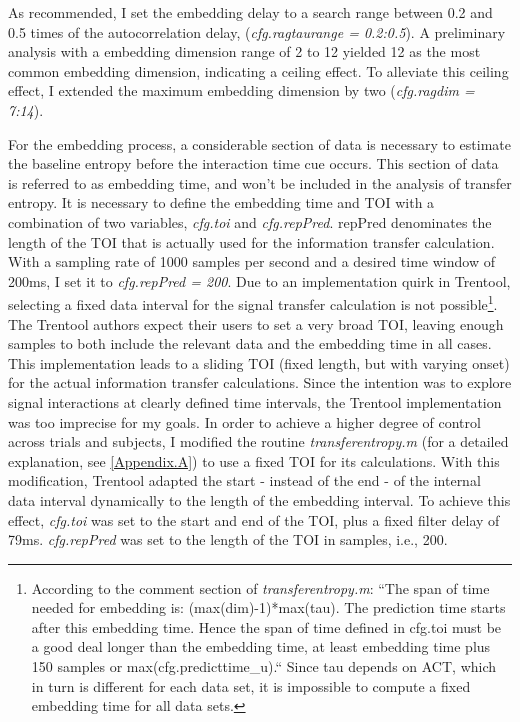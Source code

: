 As recommended, I set the embedding delay to a search range between 0.2 and 0.5 times of the autocorrelation delay, (\emph{cfg.ragtaurange = 0.2:0.5}).
A preliminary analysis with a embedding dimension range of 2 to 12 yielded 12 as the most common embedding dimension, indicating a ceiling effect.
To alleviate this ceiling effect, I extended the maximum embedding dimension by two (\emph{cfg.ragdim = 7:14}).

For the embedding process, a considerable section of data is necessary to estimate the baseline entropy before the interaction time cue occurs.
This section of data is referred to as embedding time, and won't be included in the analysis of transfer entropy.
It is necessary to define the embedding time and TOI with a combination of two variables, \emph{cfg.toi} and \emph{cfg.repPred}.
repPred denominates the length of the TOI that is actually used for the information transfer calculation.
With a sampling rate of 1000 samples per second and a desired time window of 200ms, I set it to \emph{cfg.repPred = 200}.
Due to an implementation quirk in Trentool, selecting a fixed data interval for the signal transfer calculation is not possible\footnote{According to the comment section of \emph{transferentropy.m}: ``The span of time needed for embedding is: (max(dim)-1)*max(tau). The prediction time starts after this embedding time. Hence the span of time defined in cfg.toi must be a good deal longer than the embedding time, at least embedding time plus 150 samples or max(cfg.predicttime\_u).``
Since tau depends on ACT, which in turn is different for each data set, it is impossible to compute a fixed embedding time for all data sets.}. The Trentool authors expect their users to set a very broad TOI, leaving enough samples to both include the relevant data and the embedding time in all cases.
This implementation leads to a sliding TOI (fixed length, but with varying onset) for the actual information transfer calculations.
Since the intention was to explore signal interactions at clearly defined time intervals, the Trentool implementation was too imprecise for my goals.
In order to achieve a higher degree of control across trials and subjects, I modified the routine \emph{transferentropy.m} (for a detailed explanation, see \ref{Appendix.A}) to use a fixed TOI for its calculations.
With this modification, Trentool adapted the start - instead of the end - of the internal data interval dynamically to the length of the embedding interval.
To achieve this effect, \emph{cfg.toi} was set to the start and end of the TOI, plus a fixed filter delay of 79ms.
\emph{cfg.repPred} was set to the length of the TOI in samples, i.e., 200.

